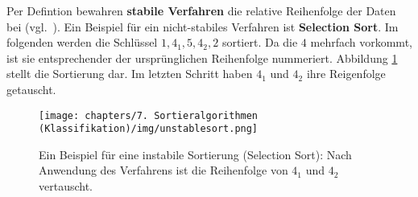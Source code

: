 Per Defintion bewahren \textbf{stabile Verfahren} die relative Reihenfolge der Daten bei (vgl.~\cite[170]{GD18e}). Ein Beispiel für ein nicht-stabiles Verfahren ist \textbf{Selection Sort}.
Im folgenden werden die Schlüssel $1, 4_1, 5, 4_2, 2$ sortiert.
Da die $4$ mehrfach vorkommt, ist sie entsprechender der ursprünglichen Reihenfolge nummeriert.
Abbildung \ref{fig:unstablesort} stellt die Sortierung dar.
Im letzten Schritt haben $4_1$ und $4_2$ ihre Reigenfolge getauscht.



\begin{figure}[h]
    \centering
    \texttt{[image: chapters/7. Sortieralgorithmen (Klassifikation)/img/unstablesort.png]}
    \caption{Ein Beispiel für eine instabile Sortierung (Selection Sort): Nach Anwendung des Verfahrens ist die Reihenfolge von $4_1$ und $4_2$ vertauscht.}
    \label{fig:unstablesort}
\end{figure}

